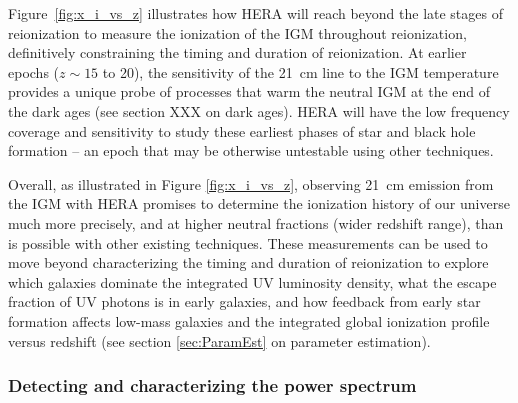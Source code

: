 \documentclass[preprint]{aastex}
\begin{document}
Figure~\ref{fig:x_i_vs_z} illustrates how HERA will
reach beyond the late stages of reionization to measure the
ionization of the IGM throughout reionization, definitively constraining the timing
and duration of reionization.  At earlier epochs ($z \sim 15$ to 20), the sensitivity of the 21~cm line 
to the IGM temperature provides a unique probe of processes that warm the neutral IGM at the
end of the dark ages (see section XXX on dark ages).  HERA will have the low frequency coverage and
sensitivity to study these earliest phases of star and black hole formation -- an epoch that may be otherwise
untestable using other techniques.

Overall, as illustrated in Figure \ref{fig:x_i_vs_z}, observing 21~cm emission from the IGM with HERA 
promises to determine the ionization history of our universe much more precisely,
and at higher neutral fractions (wider redshift range), than is possible with other existing techniques.  These measurements can
be used to move beyond characterizing the timing and duration of reionization to
explore which galaxies dominate the integrated UV luminosity density, what the escape fraction
of UV photons is in early galaxies, and how feedback from early star formation affects low-mass galaxies and 
the integrated  global ionization profile versus redshift (see section \ref{sec:ParamEst} on parameter estimation). 

\subsubsection{Detecting and characterizing the power spectrum}
\label{sec:detectPspec}
\end{document}
